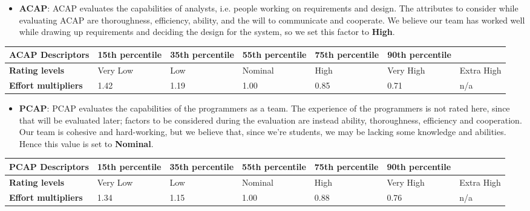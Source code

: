 	
		\begin{itemize}
			\item \textbf{ACAP}: ACAP evaluates the capabilities of analysts, i.e. people working on requirements and design. The attributes to consider while evaluating ACAP are thoroughness, efficiency, ability, and the will to communicate and cooperate. We believe our team has worked well while drawing up requirements and deciding the design for the system, so we set this factor to \textbf{High}.
		\end{itemize}
		
		\begin{center}
			\begin{tabular}{ | C{2cm} | C{2cm} | C{2cm} | C{2cm} | C{2cm} | C{2cm} | C{2cm} | }
				\hline
				\textbf{ACAP Descriptors} & 15th percentile & 35th percentile & 55th percentile & 75th percentile & 90th percentile & \\ \hline
			
				\textbf{Rating levels} & Very Low & Low & Nominal & High & Very High & Extra High\\ \hline
			
				\textbf{Effort multipliers} & 1.42 & 1.19 & 1.00 & 0.85 & 0.71 & n/a\\ \hline
			\end{tabular}
		\end{center}
		
		
		
		
		\begin{itemize}
			\item \textbf{PCAP}: PCAP evaluates the capabilities of the programmers as a team. The experience of the programmers is not rated here, since that will be evaluated later; factors to be considered during the evaluation are instead ability, thoroughness, efficiency and cooperation. Our team is cohesive and hard-working, but we believe that, since we're students, we may be lacking some knowledge and abilities. Hence this value is set to \textbf{Nominal}.
		\end{itemize}
		
		\begin{center}
			\begin{tabular}{ | C{2cm} | C{2cm} | C{2cm} | C{2cm} | C{2cm} | C{2cm} | C{2cm} | }
				\hline
				\textbf{PCAP Descriptors} & 15th percentile & 35th percentile & 55th percentile & 75th percentile & 90th percentile & \\ \hline
			
				\textbf{Rating levels} & Very Low & Low & Nominal & High & Very High & Extra High\\ \hline
			
				\textbf{Effort multipliers} & 1.34 & 1.15 & 1.00 & 0.88 & 0.76 & n/a\\ \hline
			\end{tabular}
		\end{center}
		
